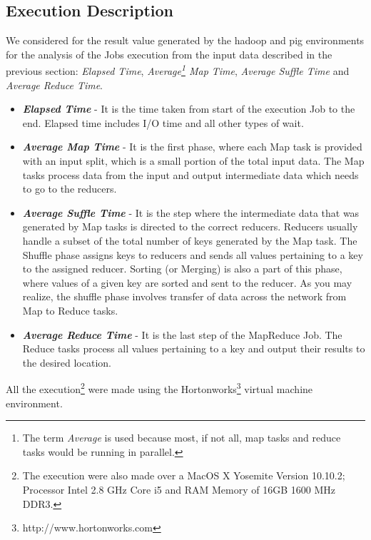  
\subsection{Execution Description}
 
 We considered for the result value generated by the hadoop and pig environments
 for the analysis of the Jobs execution from the input data described in the
 previous section: \textit{Elapsed Time}, \textit{Average\footnote{The term
 \textit{Average} is used because most, if not all, map tasks and reduce
 tasks would be running in parallel.} Map Time}, \textit{Average Suffle Time} and
 \textit{Average Reduce Time}.
  
\begin{itemize}
  \item \textbf{\textit{Elapsed Time}} -  It is the time taken from start of
  the execution Job to the end. Elapsed time includes I/O time and all
  other types of wait.
  \item \textbf{\textit{Average Map Time}} - It is the first phase, where each Map task is provided
  with an input split, which is a small portion of the total input data. The Map
  tasks process data from the input and output intermediate data which
  needs to go to the reducers.
  \item \textbf{\textit{Average Suffle Time}} - It is the step where the
  intermediate data that was generated by Map tasks is directed to the correct reducers. Reducers usually handle a
  subset of the total number of keys generated by the Map task. The Shuffle
  phase assigns keys to reducers and sends all values pertaining to a key to the
  assigned reducer. Sorting (or Merging) is also a part of this phase, where
  values of a given key are sorted and sent to the reducer. As you may realize,
  the shuffle phase involves transfer of data across the network from Map to
  Reduce tasks.       
  \item \textbf{\textit{Average Reduce Time}} - It is the last step of the
  MapReduce Job. The Reduce tasks process all values pertaining to a key and
  output their results to the desired location. 
\end{itemize}
 
All the execution\footnote{The execution were also made over a MacOS X Yosemite
Version 10.10.2; Processor Intel 2.8 GHz Core i5 and RAM Memory of 16GB 1600 MHz
DDR3.} were made using the Hortonworks\footnote{http://www.hortonworks.com}
virtual machine environment. 


